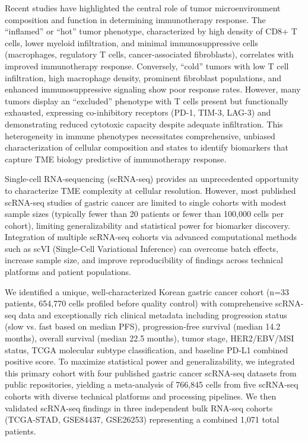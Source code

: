 \documentclass[12pt,twoside]{article}
\begin{document}
Recent studies have highlighted the central role of tumor microenvironment composition and function in determining immunotherapy response. The ``inflamed'' or ``hot'' tumor phenotype, characterized by high density of CD8+ T cells, lower myeloid infiltration, and minimal immunosuppressive cells (macrophages, regulatory T cells, cancer-associated fibroblasts), correlates with improved immunotherapy response. Conversely, ``cold'' tumors with low T cell infiltration, high macrophage density, prominent fibroblast populations, and enhanced immunosuppressive signaling show poor response rates. However, many tumors display an ``excluded'' phenotype with T cells present but functionally exhausted, expressing co-inhibitory receptors (PD-1, TIM-3, LAG-3) and demonstrating reduced cytotoxic capacity despite adequate infiltration. This heterogeneity in immune phenotypes necessitates comprehensive, unbiased characterization of cellular composition and states to identify biomarkers that capture TME biology predictive of immunotherapy response.

Single-cell RNA-sequencing (scRNA-seq) provides an unprecedented opportunity to characterize TME complexity at cellular resolution. However, most published scRNA-seq studies of gastric cancer are limited to single cohorts with modest sample sizes (typically fewer than 20 patients or fewer than 100,000 cells per cohort), limiting generalizability and statistical power for biomarker discovery. Integration of multiple scRNA-seq cohorts via advanced computational methods such as scVI (Single-Cell Variational Inference) can overcome batch effects, increase sample size, and improve reproducibility of findings across technical platforms and patient populations.

We identified a unique, well-characterized Korean gastric cancer cohort (n=33 patients, 654,770 cells profiled before quality control) with comprehensive scRNA-seq data and exceptionally rich clinical metadata including progression status (slow vs. fast based on median PFS), progression-free survival (median 14.2 months), overall survival (median 22.5 months), tumor stage, HER2/EBV/MSI status, TCGA molecular subtype classification, and baseline PD-L1 combined positive score. To maximize statistical power and generalizability, we integrated this primary cohort with four published gastric cancer scRNA-seq datasets from public repositories, yielding a meta-analysis of 766,845 cells from five scRNA-seq cohorts with diverse technical platforms and processing pipelines. We then validated scRNA-seq findings in three independent bulk RNA-seq cohorts (TCGA-STAD, GSE84437, GSE26253) representing a combined 1,071 total patients.
\end{document}
